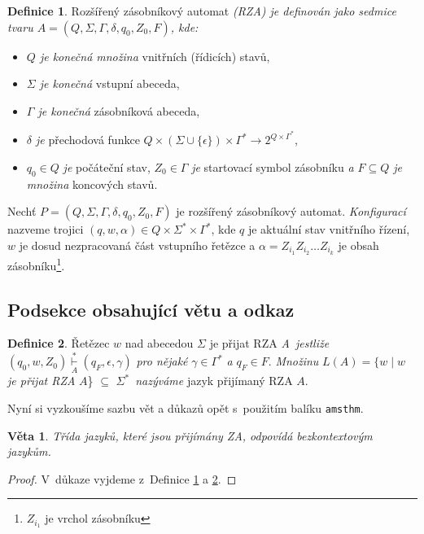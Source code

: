 \documentclass[a4paper, 11pt, twocolumn]{article}
\theoremstyle{definition}
\newtheorem{definition}{Definice}
\theoremstyle{plain}
\newtheorem{theorem}{Věta}
\begin{document}
\begin{definition}
\label{def1} Rozšířený zásobníkový automat \emph{(RZA) je definován jako sedmice tvaru $A = (Q, \Sigma, \Gamma, \delta , q_0, Z_0, F)$,
kde:}
\renewcommand\labelitemi{$\bullet$}
\begin{itemize}
    \item \emph{$Q$ je konečná množina} vnitřních (řídicích) stavů,
    \item \emph{$\Sigma$ je konečná} vstupní abeceda,
    \item \emph{$\Gamma$ je konečná} zásobníková abeceda,
    \item \emph{$\delta$ je} přechodová funkce $Q\times(\Sigma\cup\{\epsilon\})\times\Gamma^{\ast}\rightarrow2^{Q\times\Gamma^{\ast}}$,
    \item $q_0 \in Q$ \emph{je} počáteční stav, $Z_0 \in \Gamma$ \emph{je} startovací symbol
zásobníku \emph{a $F \subseteq Q$ je množina} koncových stavů.
\end{itemize}

Nechť $P = (Q, \Sigma, \Gamma, \delta, q_0, Z_0, F)$ je rozšířený zásobníkový automat. \emph{Konfigurací} nazveme trojici $(q, w, \alpha) \in Q \times \Sigma^{\ast} \times \Gamma^{\ast}$,
kde $q$ je aktuální stav vnitřního řízení,
$w$ je dosud nezpracovaná část vstupního řetězce a
$\alpha = Z_{i_1} Z_{i_2}\dots Z_{i_k}$ je obsah zásobníku\footnote{$Z_{i_1}$ je vrchol zásobníku}.
\end{definition}

\subsection{Podsekce obsahující větu a odkaz}
\begin{definition}
\label{def2} Řetězec $w$ nad abecedou $\Sigma$ je přijat RZA
\emph{A~jestliže} $(q_0, w, Z_0) \underset{A}{\overset{\ast}{\vdash}} (q_F , \epsilon, \gamma)$ \emph{pro nějaké} $\gamma \in \Gamma^{\ast}$ \emph{a} 
$q_F \in F$. \emph{Množinu} $L(A) = \{w \mid w$ \emph{je přijat RZA} $A$\} $\subseteq$ 
$\Sigma^{\ast}$~\emph{nazýváme} jazyk přijímaný RZA $A$.
\end{definition}
Nyní si vyzkoušíme sazbu vět a důkazů opět s~použitím
balíku \verb|amsthm|.


\begin{theorem}
Třída jazyků, které jsou přijímány ZA, odpovídá \emph{bezkontextovým jazykům}.
\end{theorem}

\begin{proof}
V~důkaze vyjdeme z~Definice \ref{def1} a \ref{def2}.
\end{proof}
\end{document}
